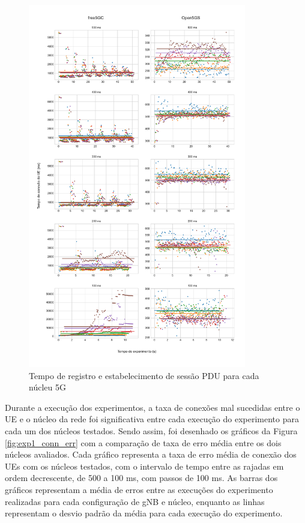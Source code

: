 \begin{figure}[H]
    \centering
    \includegraphics[width=0.85\textwidth]{TG2/Chapters/DataAnalysis/Figures/EXP1-CONN-12C-8GB.pdf}
    \caption{Tempo de registro e estabelecimento de sessão PDU para cada núcleu 5G}
    \label{fig:exp1_conn}
\end{figure}

Durante a execução dos experimentos, a taxa de conexões mal sucedidas entre o UE e o núcleo da rede foi significativa entre cada execução do experimento para cada um dos núcleos testados. Sendo assim, foi desenhado os gráficos da Figura \ref{fig:exp1_conn_err} com a comparação de taxa de erro média entre os dois núcleos avaliados.
Cada gráfico representa a taxa de erro média de conexão dos UEs com os núcleos testados, com o intervalo de tempo entre as rajadas em ordem decrescente, de 500 a 100 ms, com passos de 100 ms.
As barras dos gráficos representam a média de erros entre as execuções do experimento realizadas para cada configuração de gNB e núcleo, enquanto as linhas representam o desvio padrão da média para cada execução do experimento.

